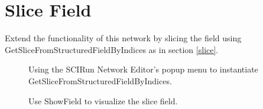 \documentclass[fleqn,11pt,openany]{book}
\begin{document}
\section{Slice Field}\label{slice2}

Extend the functionality of this network by slicing the field using GetSliceFromStructuredFieldByIndices as in section \ref{slice}.

\begin{figure}[H]
\caption{Using the SCIRun Network Editor's popup menu to instantiate GetSliceFromStructuredFieldByIndices.}
\label{fig:slicemod2}
\end{figure}

\begin{figure}[H]
\caption{Use ShowField to visualize the slice field.}
\label{fig:showslice}
\end{figure}
\end{document}
